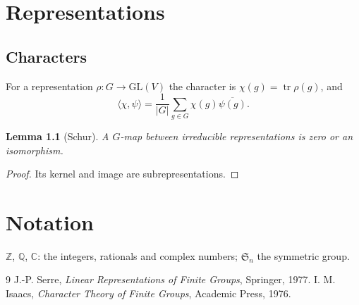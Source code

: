 \documentclass{amsbook}
\newtheorem{lemma}[theorem]{Lemma}
\theoremstyle{definition}
\theoremstyle{remark}
\numberwithin{section}{chapter}
\numberwithin{equation}{chapter}
\begin{document}
\chapter{Representations}
\section{Characters}
For a representation $\rho\colon G \to \mathrm{GL}(V)$ the character is
$\chi(g) = \operatorname{tr}\rho(g)$, and
\[
  \langle \chi, \psi \rangle = \frac{1}{|G|} \sum_{g\in G} \chi(g)\overline{\psi(g)} .
\]
\begin{lemma}[Schur]
A $G$-map between irreducible representations is zero or an isomorphism.
\end{lemma}
\begin{proof}
Its kernel and image are subrepresentations.
\end{proof}
\appendix
\chapter{Notation}
$\mathbb{Z}$, $\mathbb{Q}$, $\mathbb{C}$: the integers, rationals and
complex numbers; $\mathfrak{S}_n$ the symmetric group.
\backmatter
\begin{thebibliography}{9}
 J.-P. Serre, \emph{Linear Representations of Finite
Groups}, Springer, 1977.
 I. M. Isaacs, \emph{Character Theory of Finite Groups},
Academic Press, 1976.
\end{thebibliography}
\end{document}
